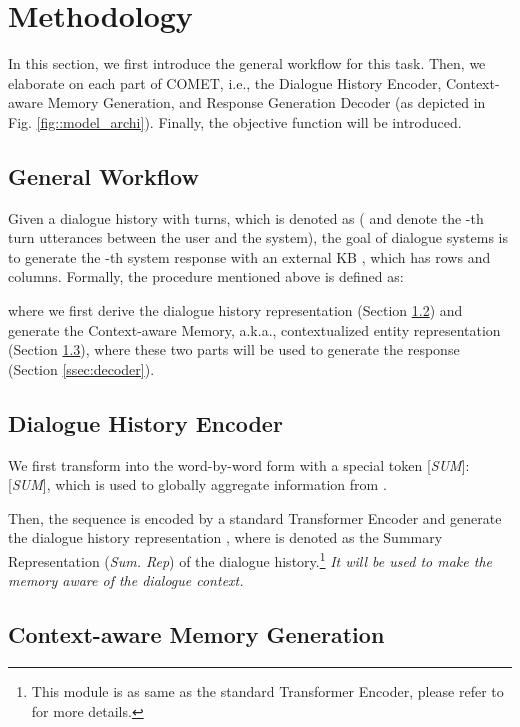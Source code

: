 \documentclass[11pt]{article}
\begin{document}
\section{Methodology}
\label{sec:methodology}

In this section, we first introduce the general workflow for this task. Then, we elaborate on each part of COMET, i.e., the Dialogue History Encoder, Context-aware Memory Generation, and Response Generation Decoder (as depicted in Fig. \ref{fig::model_archi}). Finally, the objective function will be introduced.


\subsection{General Workflow}
\label{ssec:workflow}

Given a dialogue history with  turns, which is denoted as  ( and  denote the -th turn utterances between the user and the system), the goal of dialogue systems is to generate the -th system response  with an external KB , which has  rows and  columns. Formally, the procedure mentioned above is defined as: 

where we first derive the dialogue history representation (Section \ref{ssec:encoder}) and generate the Context-aware Memory, a.k.a., contextualized entity representation (Section \ref{ssec:memory}), where these two parts will be used to generate the response  (Section \ref{ssec:decoder}).


\subsection{Dialogue History Encoder}
\label{ssec:encoder}

We first transform  into the word-by-word form with a special token [\textit{SUM}]: [\textit{SUM}], which is used to globally aggregate information from . 

Then, the sequence  is encoded by a standard Transformer Encoder and generate the dialogue history representation , where  is denoted as the Summary Representation (\textit{Sum. Rep}) of the dialogue history.\footnote{This module is as same as the standard Transformer Encoder, please refer to \cite{vaswani-2017-attention} for more details.}
\textit{It will be used to make the memory aware of the dialogue context.}


\subsection{Context-aware Memory Generation}
\label{ssec:memory}
\end{document}
